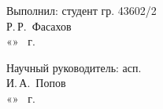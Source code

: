 





\hfill\begin{minipage}{0.4\textwidth}
  Выполнил: студент гр. 43602/2\\
  \underline{\hspace{\ML}} Р.\,Р.~Фасахов\\
  «\underline{\hspace{0.7cm}}» \underline{\hspace{\ML}} \thesisYear\ г.
\end{minipage}%

\bigskip

\hfill\begin{minipage}{0.4\textwidth}
  Научный руководитель: асп.\\
  \underline{\hspace{\ML}} И.\,А.~Попов\\
  «\underline{\hspace{0.7cm}}» \underline{\hspace{\ML}} \thesisYear\ г.
\end{minipage}%

\vfill

%
\vspace{0pt plus4fill} %
\begin{center}%
{\thesisCity \\ \thesisYear}
\end{center}%
\newpage
